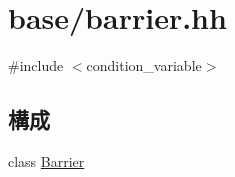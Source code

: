 \hypertarget{barrier_8hh}{
\section{base/barrier.hh}
\label{barrier_8hh}
}
{\ttfamily \#include $<$condition\_\-variable$>$}\par
\subsection*{構成}
\begin{DoxyCompactItemize}
\item 
class \hyperlink{classBarrier}{Barrier}
\end{DoxyCompactItemize}
